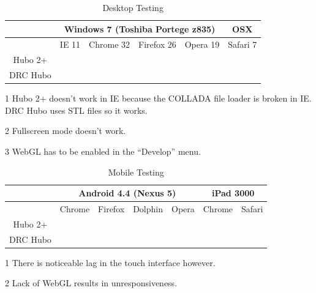 \documentclass[letterpaper, 10 pt, conference]{ieee/ieeeconf}  %
\newcommand{\cmark}{\ding{51}}%
\newcommand{\xmark}{\ding{55}}%
\begin{document}
\begin{table}[h]
\begin{center}
\begin{threeparttable}[b]
\caption{Desktop Testing}
\label{tab:DesktopTesting}
\begin{tabular}{|c|c|c|c|c|c|}
\hline         & \multicolumn{4}{|c|}{Windows 7 (Toshiba Portege z835)} & \multicolumn{1}{|c|}{OSX} \\ 
\hline          & IE 11            & Chrome 32 & Firefox 26       & Opera 19 & Safari 7 \\ 
\hline Hubo 2+  & \xmark \tnote{1} & \cmark    & \cmark \tnote{2} & \cmark   & \cmark  \tnote{2} \tnote{,3} \\ 
\hline DRC Hubo & \cmark \tnote{2} & \cmark    & \cmark \tnote{2} & \cmark   & \cmark  \tnote{2} \tnote{,3} \\ 
\hline 
\end{tabular} 
\begin{tablenotes}
\item [1] Hubo 2+ doesn't work in IE because the COLLADA file loader is broken in IE. DRC Hubo uses STL files so it works.
\item [2] Fullscreen mode doesn't work.
\item [3] WebGL has to be enabled in the ``Develop'' menu.
\end{tablenotes}
\end{threeparttable}
\end{center}
\end{table}
\begin{table}[h]
\begin{center}
\begin{threeparttable}[b]
\caption{Mobile Testing}
\label{tab:MobileTesting}
\begin{tabular}{|c|c|c|c|c|c|c|}
\hline         & \multicolumn{4}{|c|}{Android 4.4 (Nexus 5)} & \multicolumn{2}{|c|}{iPad 3000} \\ 
\hline         & Chrome & Firefox          & Dolphin          & Opera  & Chrome & Safari \\ 
\hline Hubo 2+ & \cmark & \cmark \tnote{1} & \xmark \tnote{2} & \cmark &        & \\ 
\hline DRC Hubo& \cmark & \cmark \tnote{1} & \xmark \tnote{2} & \cmark &        & \\ 
\hline 
\end{tabular} 
\begin{tablenotes}
\item [1] There is noticeable lag in the touch interface however.
\item [2] Lack of WebGL results in unresponsiveness.
\end{tablenotes}
\end{threeparttable}
\end{center}
\end{table}
\end{document}

